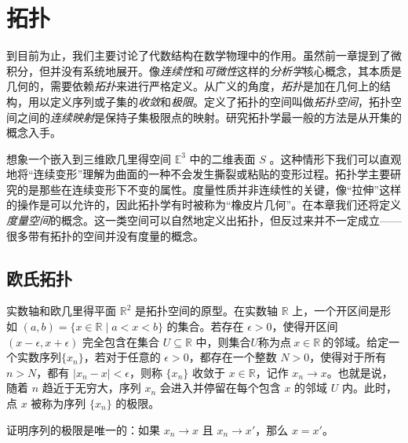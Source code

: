 \chapter{拓扑}
到目前为止，我们主要讨论了代数结构在数学物理中的作用。虽然前一章提到了微积分，但并没有系统地展开。像\emph{连续性}和\emph{可微性}这样的\emph{分析学}核心概念，其本质是几何的，需要依赖\emph{拓扑}来进行严格定义。从广义的角度，\emph{拓扑}是加在几何上的结构，用以定义序列或子集的\emph{收敛}和\emph{极限}。定义了拓扑的空间叫做\emph{拓扑空间}，拓扑空间之间的\emph{连续映射}是保持子集极限点的映射。研究拓扑学最一般的方法是从开集的概念入手。

想象一个嵌入到三维欧几里得空间 $\mathbb{E}^{3}$ 中的二维表面 $S$ 。这种情形下我们可以直观地将“连续变形”理解为曲面的一种不会发生撕裂或粘贴的变形过程。拓扑学主要研究的是那些在连续变形下不变的属性。度量性质并非连续性的关键，像“拉伸”这样的操作是可以允许的，因此拓扑学有时被称为“橡皮片几何”。在本章我们还将定义\emph{度量空间}的概念。这一类空间可以自然地定义出拓扑，但反过来并不一定成立——很多带有拓扑的空间并没有度量的概念。

\section{欧氏拓扑}

实数轴和欧几里得平面 $\mathbb{R}^{2}$ 是拓扑空间的原型。在实数轴 $\mathbb{R}$ 上，一个开区间是形如 $(a,b)=\{x\in \mathbb{R} \mid a< x< b\}$ 的集合。若存在 $\epsilon  >0$，使得开区间 $(x-\epsilon ,x+\epsilon )$ 完全包含在集合 $U\subseteq \mathbb{R}$ 中，则集合$U$称为点$\ x\in \mathbb{R} \ $的邻域。给定一个实数序列$\{x_{n} \}$，若对于任意的 $\epsilon  >0$，都存在一个整数 $N >0$，使得对于所有 $n >N$，都有 $|x_{n} -x|< \epsilon $，则称 $\{x_{n} \}$ 收敛于 $x\in \mathbb{R}$，记作 $x_{n}\rightarrow x$。也就是说，随着 $ n$ 趋近于无穷大，序列 $x_{n}$ 会进入并停留在每个包含 $x$ 的邻域 $U$ 内。此时，点 $x$ 被称为序列 $\{x_{n} \}$ 的极限。

\begin{exercise}
    证明序列的极限是唯一的：如果 $x_{n}\rightarrow x$ 且 $x_{n}\rightarrow x'$，那么 $x=x'$。
\end{exercise}

